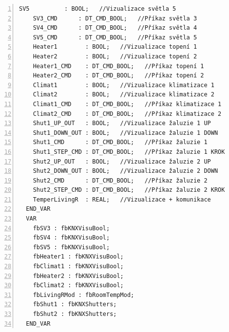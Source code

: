\begin{lstlisting}[language=ST, breaklines=true, numbers=left, numberstyle=\small, numbersep=10pt, frame=single, basicstyle=\ttfamily\small, caption={Definice funkčního bloku fbLivRoom}, label={lst:fbLivRoom}]
    SV5          : BOOL;   //Vizualizace světla 5
    SV3_CMD      : DT_CMD_BOOL;   //Příkaz světla 3
    SV4_CMD      : DT_CMD_BOOL;   //Příkaz světla 4
    SV5_CMD      : DT_CMD_BOOL;   //Příkaz světla 5
    Heater1        : BOOL;   //Vizualizace topení 1
    Heater2        : BOOL;   //Vizualizace topení 2
    Heater1_CMD    : DT_CMD_BOOL;   //Příkaz topení 1
    Heater2_CMD    : DT_CMD_BOOL;   //Příkaz topení 2
    Climat1        : BOOL;   //Vizualizace klimatizace 1
    Climat2        : BOOL;   //Vizualizace klimatizace 2
    Climat1_CMD    : DT_CMD_BOOL;   //Příkaz klimatizace 1
    Climat2_CMD    : DT_CMD_BOOL;   //Příkaz klimatizace 2
    Shut1_UP_OUT   : BOOL;   //Vizualizace žaluzie 1 UP
    Shut1_DOWN_OUT : BOOL;   //Vizualizace žaluzie 1 DOWN
    Shut1_CMD      : DT_CMD_BOOL;   //Příkaz žaluzie 1
    Shut1_STEP_CMD : DT_CMD_BOOL;   //Příkaz žaluzie 1 KROK
    Shut2_UP_OUT   : BOOL;   //Vizualizace žaluzie 2 UP
    Shut2_DOWN_OUT : BOOL;   //Vizualizace žaluzie 2 DOWN
    Shut2_CMD      : DT_CMD_BOOL;   //Příkaz žaluzie 2
    Shut2_STEP_CMD : DT_CMD_BOOL;   //Příkaz žaluzie 2 KROK
    TemperLivingR  : REAL;   //Vizualizace + komunikace
  END_VAR
  VAR
    fbSV3 : fbKNXVisuBool;
    fbSV4 : fbKNXVisuBool;
    fbSV5 : fbKNXVisuBool;
    fbHeater1 : fbKNXVisuBool;
    fbClimat1 : fbKNXVisuBool;
    fbHeater2 : fbKNXVisuBool;
    fbClimat2 : fbKNXVisuBool;
    fbLivingRMod : fbRoomTempMod;
    fbShut1 : fbKNXShutters;
    fbShut2 : fbKNXShutters;
  END_VAR
\end{lstlisting}
